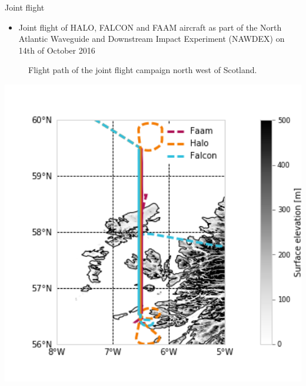 \documentclass[8pt, final,hyperref={pdfpagelabels=false}]{beamer}
\begin{document}
\begin{frame}
\begin{columns}[t]
\begin{column}{.48\linewidth}
\begin{block}{Joint flight}
          \begin{minipage}[t]{0.6\textwidth}
            \vspace{0pt}
            \begin{itemize}
            \item Joint flight of HALO, FALCON and FAAM aircraft as part of the
              North Atlantic Waveguide and Downstream Impact Experiment (NAWDEX)
              on 14th of October 2016
            \end{itemize}
            \begin{minipage}[b]{0.4\textwidth}
              \vspace{0pt}
              \rule{0pt}{5cm}
            \end{minipage}\hfill%
            \begin{minipage}[b]{0.5\textwidth}
              \vspace{1cm}
              \begin{figure}
              \caption{Flight path of the joint flight campaign  north west of Scotland.}
              \end{figure}
            \end{minipage}
          \end{minipage}%
          \begin{minipage}[t]{0.38\textwidth}
            \vspace{-2cm}
            \includegraphics[width=1.0\textwidth]{../plots/flight_path.png}
          \end{minipage}%


\end{block}
\end{column}
\end{columns}
\end{frame}
\end{document}
